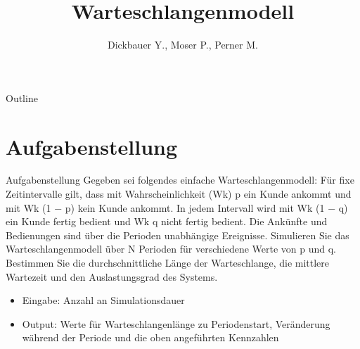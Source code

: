 

\title[BSP17 - Warteschlangenmodell]{Warteschlangenmodell}
\author{Dickbauer Y., Moser P., Perner M.}



\begin{frame}
  \titlepage
\end{frame}

\begin{frame}{Outline}
  \tableofcontents
\end{frame}

\section{Aufgabenstellung}
\begin{frame}{Aufgabenstellung}
Gegeben sei folgendes einfache Warteschlangenmodell: Für fixe Zeitintervalle gilt, dass
mit Wahrscheinlichkeit (Wk) p ein Kunde ankommt und mit Wk (1 − p) kein Kunde
ankommt. In jedem Intervall wird mit Wk (1 − q) ein Kunde fertig bedient und Wk q
nicht fertig bedient. Die Ankünfte und Bedienungen sind über die Perioden unabhängige
Ereignisse. Simulieren Sie das Warteschlangenmodell über N Perioden für verschiedene
Werte von p und q. Bestimmen Sie die durchschnittliche Länge der Warteschlange, die
mittlere Wartezeit und den Auslastungsgrad des Systems.

\begin{itemize}
  \item Eingabe: Anzahl an Simulationsdauer
  \item Output: Werte für Warteschlangenlänge zu Periodenstart, Veränderung während
der Periode und die oben angeführten Kennzahlen
\end{itemize}
\end{frame}


